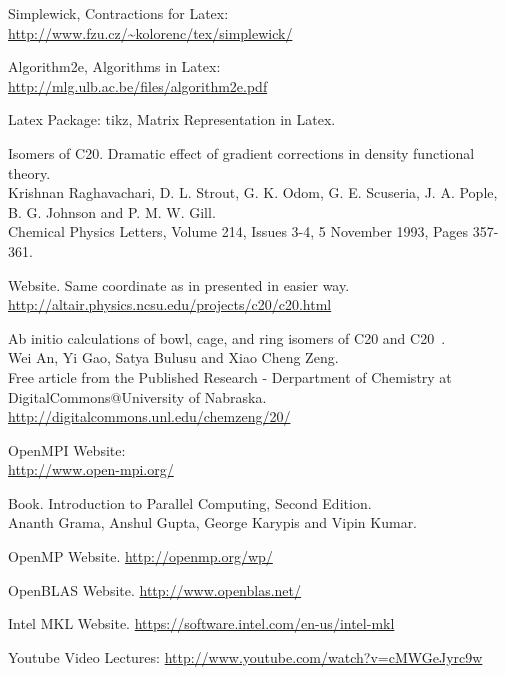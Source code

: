 \documentclass[a4paper,norsk,11pt,twoside]{report}
\begin{document}
\begin{thebibliography}{}
Simplewick, Contractions for Latex:\\
\url{http://www.fzu.cz/~kolorenc/tex/simplewick/}

Algorithm2e, Algorithms in Latex: \\
\url{http://mlg.ulb.ac.be/files/algorithm2e.pdf}

Latex Package: tikz, Matrix Representation in Latex.

Isomers of C20. Dramatic effect of gradient corrections in density functional theory. \\
Krishnan Raghavachari, D. L. Strout, G. K. Odom, G. E. Scuseria, J. A. Pople, B. G. Johnson and P. M. W. Gill. \\
Chemical Physics Letters, Volume 214, Issues 3-4, 5 November 1993, Pages 357-361.

Website. Same coordinate as in  \cite{c20coordinatesarticlezz} presented in easier way. \\
\url{http://altair.physics.ncsu.edu/projects/c20/c20.html}

Ab initio calculations of bowl, cage, and ring isomers of C20 and C20~. \\
Wei An, Yi Gao, Satya Bulusu and Xiao Cheng Zeng. \\
Free article from the Published Research - Derpartment of Chemistry at DigitalCommons@University of Nabraska. \\
\url{http://digitalcommons.unl.edu/chemzeng/20/}

OpenMPI Website: \\
\url{http://www.open-mpi.org/}

Book. Introduction to Parallel Computing, Second Edition. \\
Ananth Grama, Anshul Gupta, George Karypis and Vipin Kumar. 

OpenMP Website. 
\url{http://openmp.org/wp/}

OpenBLAS Website.
\url{http://www.openblas.net/}

Intel MKL Website.
\url{https://software.intel.com/en-us/intel-mkl}

Youtube Video Lectures:
\url{http://www.youtube.com/watch?v=cMWGeJyrc9w}


\end{thebibliography}
\end{document}
